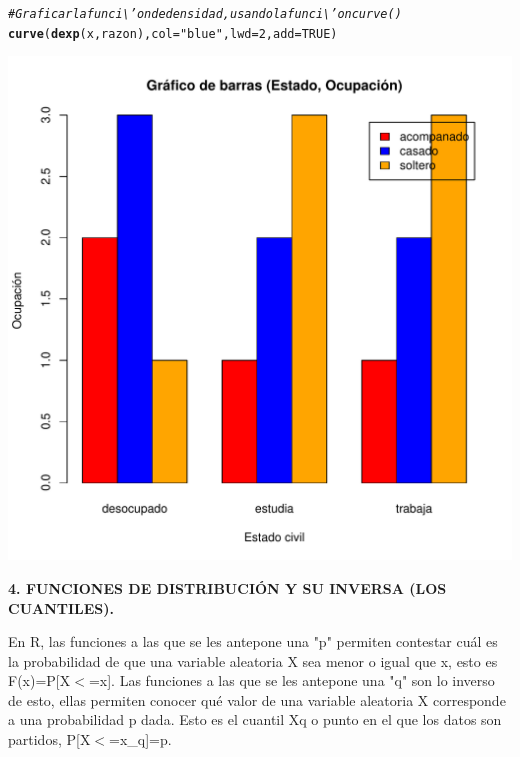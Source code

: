 \documentclass[12pt,letterpaper]{article}\usepackage[]{graphicx}\usepackage[]{color}
\makeatletter
\def\maxwidth{ %
  \ifdim\Gin@nat@width>\linewidth
    \linewidth
  \else
    \Gin@nat@width
  \fi
}
\newcommand{\hlnum}[1]{\textcolor[rgb]{0.686,0.059,0.569}{#1}}%
\newcommand{\hlstr}[1]{\textcolor[rgb]{0.192,0.494,0.8}{#1}}%
\newcommand{\hlcom}[1]{\textcolor[rgb]{0.678,0.584,0.686}{\textit{#1}}}%
\newcommand{\hlstd}[1]{\textcolor[rgb]{0.345,0.345,0.345}{#1}}%
\newcommand{\hlkwc}[1]{\textcolor[rgb]{0.333,0.667,0.333}{#1}}%
\newcommand{\hlkwd}[1]{\textcolor[rgb]{0.737,0.353,0.396}{\textbf{#1}}}%
\newenvironment{kframe}{%
 \def\at@end@of@kframe{}%
 \ifinner\ifhmode%
  \def\at@end@of@kframe{\end{minipage}}%
  \begin{minipage}{\columnwidth}%
 \fi\fi%
 \def\FrameCommand##1{\hskip\@totalleftmargin \hskip-\fboxsep
 \colorbox{shadecolor}{##1}\hskip-\fboxsep
     \hskip-\linewidth \hskip-\@totalleftmargin \hskip\columnwidth}%
 \MakeFramed {\advance\hsize-\width
   \@totalleftmargin\z@ \linewidth\hsize
   \@setminipage}}%
 {\par\unskip\endMakeFramed%
 \at@end@of@kframe}
\newenvironment{knitrout}{}{} %
\makeatother
\begin{document}
\begin{knitrout}
\begin{kframe}
\begin{alltt}
\hlcom{# Graficar la funci\textbackslash{}'on de densidad, usando la funci\textbackslash{}'on curve() }
\hlkwd{curve}\hlstd{(}\hlkwd{dexp}\hlstd{(x, razon),} \hlkwc{col}\hlstd{=}\hlstr{"blue"}\hlstd{,} \hlkwc{lwd}\hlstd{=}\hlnum{2}\hlstd{,} \hlkwc{add}\hlstd{=}\hlnum{TRUE}\hlstd{)}
\end{alltt}
\end{kframe}
\includegraphics[width=\maxwidth]{figure/unnamed-chunk-18-1} 

\end{knitrout}

\newpage

\begin{center}
\textbf{4. FUNCIONES DE DISTRIBUCI\'ON Y SU INVERSA (LOS CUANTILES).}
\end{center}

En R, las funciones a las que se les antepone una "p" permiten contestar cu\'al es la probabilidad de que una variable aleatoria X sea menor o igual que x, esto es F(x)=P[X$<$=x]. Las funciones a las que se les antepone una "q" son lo inverso de esto, ellas permiten conocer qu\'e valor de una variable aleatoria X corresponde a una probabilidad p dada. Esto es el cuantil Xq o punto en el que los datos son partidos, P[X$<$=x_q]=p.\\
\end{document}
